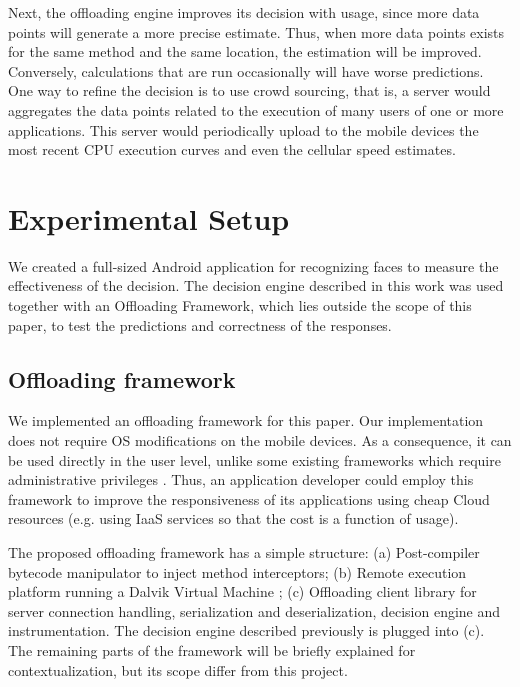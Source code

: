 \documentclass[10pt, conference, letterpaper]{IEEEtran}
\begin{document}
Next, the offloading engine improves its decision with usage, since more data points will generate a more precise estimate. Thus, when more data points exists for the same method and the same location, the estimation will be improved. Conversely, calculations that are run occasionally will have worse predictions. One way to refine the decision is to use crowd sourcing, that is,  a server would aggregates the data points related to the execution of many users of one or more applications. This server would periodically upload to the mobile devices the most recent CPU execution curves and even the cellular speed estimates.

\section{Experimental Setup}
\label{sec:setup}

We created a full-sized Android application for recognizing faces to measure the effectiveness of the decision. The decision engine described in this work was used together with an Offloading Framework, which lies outside the scope of this paper, to test the predictions and correctness of the responses.

\subsection{Offloading framework}

We implemented an offloading framework for this paper. Our implementation does not require OS modifications on the mobile devices. As a consequence, it can be used directly in the user level, unlike some existing frameworks which require administrative privileges  \cite{Chun:2011:CEE:1966445.1966473}. Thus, an application developer could employ this framework to improve the responsiveness of its applications using cheap Cloud resources (e.g. using IaaS services so that the cost is a function of usage).

  The proposed offloading framework has a simple structure: (a) Post-compiler bytecode manipulator to inject method interceptors; (b) Remote execution platform running a Dalvik Virtual Machine \cite{ehringer2010dalvik}; (c) Offloading client library for server connection handling, serialization and deserialization, decision engine and instrumentation.  The decision engine described previously is plugged into (c). The remaining parts of the framework will be briefly explained for contextualization, but its scope differ from this project.
\end{document}
